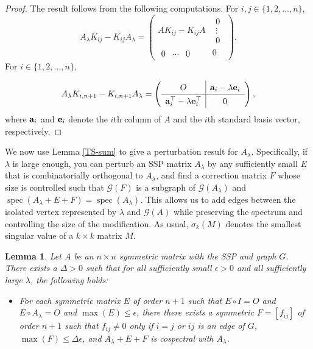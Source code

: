 \documentclass[11pt]{article}
\newtheorem{lem}[thm]{Lemma}
\theoremstyle{definition}
\theoremstyle{definition}
\theoremstyle{definition}
\newcommand{\ba}{{\bf a}}
\newcommand{\be}{{\bf e}}
\newcommand{\x}{\times}
\newcommand{\G}{\mathcal{G}}
\def\spec{\operatorname{spec}}
\def\trans{^{\top}}
\begin{document}
\begin{proof}
The result follows from the following computations.
For $i,j \in \{1,2, \ldots, n\}$,   
 \[
A_{\lambda}K_{ij} - K_{ij}A_{\lambda}=\left( \begin{array}{c|c} 
AK_{ij} - K_{ij}A& \begin{array}{c} 0 \\ \vdots \\ 0 \end{array} \\  \hline
\begin{array}{ccc} 0 & \cdots & 0 \end{array}  &  0 \end{array} \right).
\]
For $i\in \{1,2,\ldots, n\}$,

 \[
A_{\lambda}K_{i,n+1} - K_{i,n+1}A_{\lambda}= \left(\renewcommand{\arraystretch}{1.3} \begin{array}{c|c}
O & \ba_i-\lambda \be_i  \\ \hline 
 \ba_i\trans-\lambda \be_i\trans   & 0 
\end{array} \right),
\]
 where $\ba_i$ and $\be_i$ denote  the $i$th column of $A$ and the $i$th standard basis vector, respectively.  \end{proof}
 
We now use Lemma \ref{TS-sum} to give a perturbation result for $A_{\lambda}$. Specifically, if $\lambda$ is large enough, you can perturb an SSP matrix $A_\lambda$  by any sufficiently small $E$ that is combinatorially orthogonal to $A_\lambda$, and find a correction matrix $F$ whose size is controlled such that $\G(F)$ is a subgraph of $\G(A_\lambda)$ and $\spec(A_\lambda+E+F)=\spec(A_\lambda)$.  This allows us to add edges between the isolated vertex represented by $\lambda$ and $\G(A)$ while preserving the spectrum and controlling the size of the modification.  As usual, $\sigma_k(M)$ denotes the smallest singular value of a $k\x k$  matrix $M$.

\begin{lem}
\label{epsilon-bound}
Let $A$ be an $n\times n$ symmetric matrix with the SSP and graph $G$. 
There exists a $\Delta>0$ such that for all  sufficiently small  $\epsilon >0$ and all  sufficiently large $\lambda$, 
the following holds:
\begin{itemize}
\item[] For each symmetric matrix $E$ of order $n+1$  such that $E \circ I=O$ and $E\circ A_{\lambda}=O$ 
and $\max(E)\leq \epsilon$, there there exists a symmetric $F=[f_{ij}]$  of order $n+1$
such that $f_{ij} \neq 0$ only if $i=j$ or $ij$ is an edge of $G$,  $\max (F) \leq \Delta \epsilon$, and $A_{\lambda}+E+F$ is cospectral with $A_{\lambda}$.
\end{itemize}
\end{lem}
\end{document}
